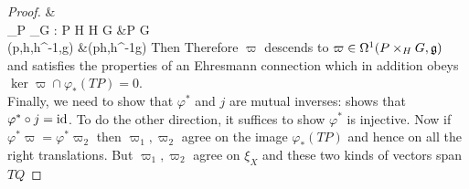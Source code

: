 \documentclass{article}
\begin{document}
\begin{proof}
{		&\phantom{=} \\
		\mu_P \times \mu_G : P \times H \times H \times G &\to P \times G \\
		(p,h,h^{-1},g) &\mapsto (ph,h^{-1}g)
	}
	Then 
	Therefore $\varpi$ descends to $\varpi \in \Omega^1(P\times_H G,\mathfrak{g})$ and satisfies the properties of an Ehresmann connection which in addition obeys $\ker \varpi \cap \varphi_\ast(TP)=0 $. \\
	Finally, we need to show that $\varphi^\ast$ and $j$ are mutual inverses:
	shows that $\varphi^\ast \circ j = \operatorname{id}$. To do the other direction, it suffices to show $\varphi^\ast$ is injective. Now if $\varphi^\ast \varpi = \varphi^\ast \varpi_2$ then $\varpi_1,\varpi_2$ agree on the image $\varphi_\ast(TP)$ and hence on all the right translations. But $\varpi_1, \varpi_2$ agree on $\xi_X$ and these two kinds of vectors span $TQ$
\end{proof}

\end{document}
